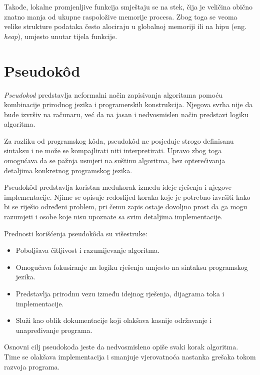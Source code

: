 Takođe, lokalne promjenljive funkcija smještaju se na stek, čija je veličina obično znatno manja od ukupne raspoložive memorije procesa. Zbog toga se veoma velike strukture podataka često alociraju u globalnoj memoriji ili na hipu (eng. \emph{heap}), umjesto unutar tijela funkcije.

\section{Pseudok\^od}

\textit{Pseudokod} predstavlja neformalni način zapisivanja algoritama pomoću kombinacije prirodnog jezika i programerskih konstrukcija. Njegova svrha nije da bude izvršiv na računaru, već da na jasan i nedvosmislen način predstavi logiku algoritma.

Za razliku od programskog k\^oda, pseudok\^od ne posjeduje strogo definisanu sintaksu i ne može se kompajlirati niti interpretirati. Upravo zbog toga omogućava da se pažnja usmjeri na suštinu algoritma, bez opterećivanja detaljima konkretnog programskog jezika.

Pseudok\^od predstavlja koristan međukorak između ideje rješenja i njegove implementacije. Njime se opisuje redoslijed koraka koje je potrebno izvršiti kako bi se riješio određeni problem, pri čemu zapis ostaje dovoljno prost da ga mogu razumjeti i osobe koje nisu upoznate sa svim detaljima implementacije.

Prednosti korišćenja pseudok\^oda su višestruke:

\begin{itemize}
	\item Poboljšava čitljivost i razumijevanje algoritma.
	
	\item Omogućava fokusiranje na logiku rješenja umjesto na sintaksu programskog jezika.
	
	\item Predstavlja prirodnu vezu između idejnog rješenja, dijagrama toka i implementacije.
	
	\item Služi kao oblik dokumentacije koji olakšava kasnije održavanje i unapre\-đivanje programa.
	
\end{itemize}

Osnovni cilj pseudokoda jeste da nedvosmisleno opiše svaki korak algoritma. Time se olakšava implementacija i smanjuje vjerovatnoća nastanka grešaka tokom razvoja programa.

